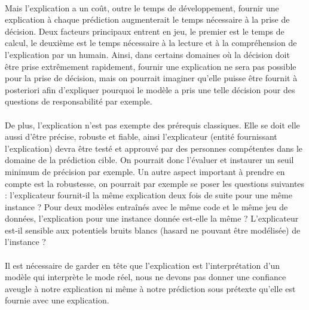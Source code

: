 \paragraph{}Mais l'explication a un coût, outre le temps de développement, fournir une explication à chaque prédiction augmenterait le temps nécessaire à la prise de décision. Deux facteurs principaux entrent en jeu, le premier est le temps de calcul, le deuxième est le temps nécessaire à la lecture et à la compréhension de l'explication par un humain. Ainsi, dans certains domaines où la décision doit être prise extrêmement rapidement, fournir une explication ne sera pas possible pour la prise de décision, mais on pourrait imaginer qu'elle puisse être fournit à posteriori afin d'expliquer pourquoi le modèle a pris une telle décision pour des questions de responsabilité par exemple.

\paragraph{}De plus, l'explication n'est pas exempte des prérequis classiques. Elle se doit elle aussi d'être précise, robuste et fiable, ainsi l'explicateur (entité fournissant l'explication) devra être testé et approuvé par des personnes compétentes dans le domaine de la prédiction cible. On pourrait donc l'évaluer et instaurer un seuil minimum de précision par exemple. Un autre aspect important à prendre en compte est la robustesse, on pourrait par exemple se poser les questions suivantes : l'explicateur fournit-il la même explication deux fois de suite pour une même instance ? Pour deux modèles entraînés avec le même code et le même jeu de données, l'explication pour une instance donnée est-elle la même ? L'explicateur est-il sensible aux potentiels bruits blancs (hasard ne pouvant être modélisée) de l'instance ?

\paragraph{}Il est nécessaire de garder en tête  que l'explication est l'interprétation d'un modèle qui interprète le mode réel, nous ne devons pas donner une confiance aveugle à notre explication ni même à notre prédiction sous prétexte qu'elle est fournie avec une explication.
